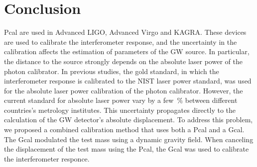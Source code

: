 \documentclass[%
 reprint,
superscriptaddress,
 amsmath,amssymb,
 aps,
]{revtex4-1}
\begin{document}

\section{Conclusion}
Pcal are used in Advanced LIGO, Advanced Virgo and KAGRA. These devices are used to calibrate the interferometer response, and the uncertainty in the calibration affects the estimation of parameters of the GW source. In particular, the distance to the source strongly depends on the absolute laser power of the photon calibrator. In previous studies, the gold standard, in which the interferometer response is calibrated to the NIST laser power standard, was used for the absolute laser power calibration of the photon calibrator. However, the current standard for absolute laser power vary by a few~\% between different countries's metrology institutes. This uncertainty propagates directly to the calculation of the GW detector's absolute displacement.
To address this problem, we proposed a combined calibration method that uses both a Pcal and a Gcal. The Gcal modulated the test mass using a dynamic gravity field. When canceling the displacement of the test mass using the Pcal, the Gcal was used to calibrate the interferometer responce.
\end{document}
